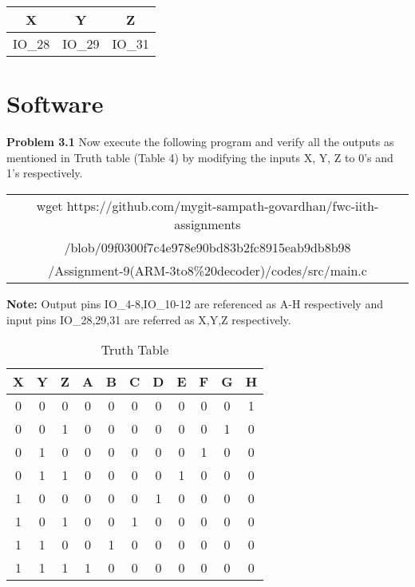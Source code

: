 \documentclass[journal,12pt,twocolumn]{IEEEtran}
\begin{document}
    \begin{table}[h]
    \centering
    \begin{tabular}{| c | c | c |}
    \hline
    \textbf{X} & \textbf{Y} & \textbf{Z} \\
    \hline
    IO\_28 & IO\_29 & IO\_31  \\
    \hline
    \end{tabular}
    \caption{}
    \label{tab:my_label}
 \end{table}


\section{Software}

\textbf{Problem 3.1} Now execute the following program and verify all the outputs as mentioned in Truth table (Table 4) by modifying the inputs X, Y, Z to 0's and 1's respectively. \\
\begin{table}[h]
    \centering
    \begin{tabular}{| c |}
    \hline
    wget https://github.com/mygit-sampath-govardhan/fwc-iith-assignments\\/blob/09f0300f7c4e978e90bd83b2fc8915eab9db8b98\\/Assignment-9(ARM-3to8\%20decoder)/codes/src/main.c\\
    \hline
    \end{tabular}
\end{table}

\textbf{Note:} Output pins IO\_4-8,IO\_10-12 are referenced as A-H respectively and input pins IO\_28,29,31 are referred as X,Y,Z respectively.\\

    \begin{table}[h]
    \centering
    \begin{tabular}{| c | c | c || c | c | c | c | c | c | c | c |}
    \hline
    \textbf{X} & \textbf{Y} & \textbf{Z} & \textbf{A} & \textbf{B} & \textbf{C} & \textbf{D} & \textbf{E} & \textbf{F} & \textbf{G} & \textbf{H} \\
    \hline
    0 & 0 & 0 & 0 & 0 & 0 & 0 & 0 & 0 & 0 & 1  \\
    \hline
    0 & 0 & 1 & 0 & 0 & 0 & 0 & 0 & 0 & 1 & 0  \\
    \hline
    0 & 1 & 0 & 0 & 0 & 0 & 0 & 0 & 1 & 0 & 0  \\
    \hline
    0 & 1 & 1 & 0 & 0 & 0 & 0 & 1 & 0 & 0 & 0  \\
    \hline
    1 & 0 & 0 & 0 & 0 & 0 & 1 & 0 & 0 & 0 & 0  \\
    \hline
    1 & 0 & 1 & 0 & 0 & 1 & 0 & 0 & 0 & 0 & 0  \\
    \hline
    1 & 1 & 0 & 0 & 1 & 0 & 0 & 0 & 0 & 0 & 0  \\
    \hline
    1 & 1 & 1 & 1 & 0 & 0 & 0 & 0 & 0 & 0 & 0  \\
    \hline
    \end{tabular}
    \caption{Truth Table}
    \label{tab:my_label}
 \end{table}
\end{document}
